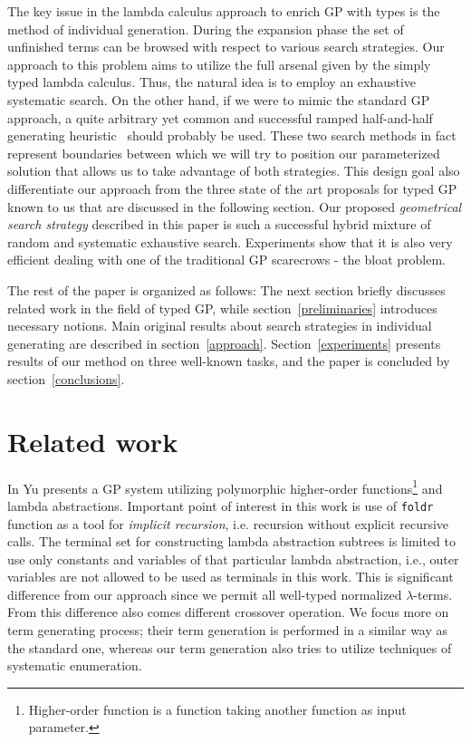 \documentclass[conference]{IEEEtran}
\newcommand{\lterms}{$\lambda$-terms\xspace}
\begin{document}
The key issue in the lambda calculus approach to enrich GP with types is the method of individual generation. During the expansion phase the set of unfinished terms can be browsed with respect to various search strategies. Our approach to this problem aims to utilize the full arsenal given by the simply typed lambda calculus. Thus, the natural idea is to employ an exhaustive systematic search. On the other hand, if we were to mimic the standard GP approach, a quite arbitrary yet common and successful ramped half-and-half generating heuristic~\cite{fg} should probably be used.  
These two search methods in fact represent boundaries between which we will try to position our parameterized solution that allows us to take advantage of both strategies. This design goal also differentiate our approach from 
the three state of the art proposals for typed GP known to us that are discussed in the following section. 
Our proposed \emph{geometrical search strategy} described in this paper is such a successful hybrid mixture of random and systematic exhaustive search. Experiments show that it is also very efficient dealing with one of the traditional GP scarecrows - the bloat problem.

The rest of the paper is organized as follows: The next section briefly discusses related work in the field of typed GP, while section~\ref{preliminaries} introduces necessary notions. Main original results about search strategies in individual generating are described in section~\ref{approach}. Section~\ref{experiments} presents results of our method on three well-known tasks, and the paper is concluded by section~\ref{conclusions}.

\section{Related work}
\label{related}

In \cite{yu01} Yu presents a GP system utilizing
polymorphic higher-order functions\footnote{Higher-order 
function is a function taking another function as 
input parameter.} and lambda abstractions.
Important point of interest in this work is use of
\texttt{foldr} function as a tool for \textit{implicit recursion},
i.e. recursion without explicit recursive calls. 
The terminal set for constructing lambda abstraction subtrees 
is limited to use only constants and variables of that particular
lambda abstraction, i.e., outer variables are not allowed to be used
as terminals in this work. This is significant difference from our approach 
since we permit all well-typed normalized \lterms. From this difference also
comes different crossover operation. We focus more on term generating process; 
their term generation is performed in a similar way as the standard one, 
whereas our term generation also tries to utilize techniques of systematic enumeration. 
\end{document}
